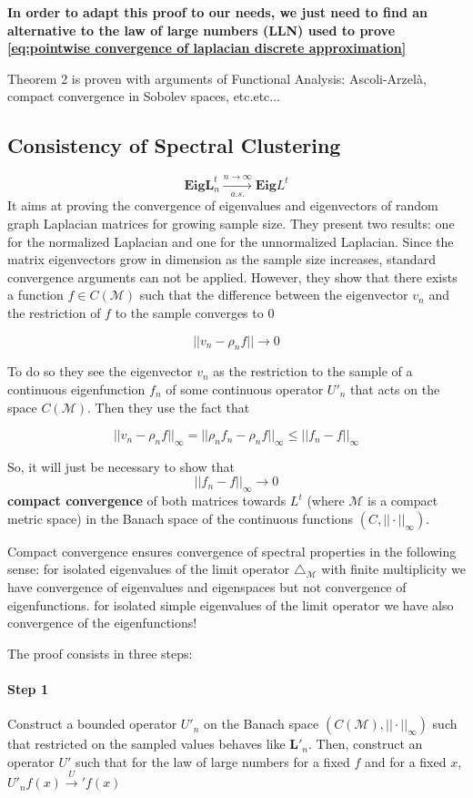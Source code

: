 \textbf{In order to adapt this proof to our needs, we just need to find an alternative to the law of large numbers (LLN) used to prove \ref{eq:pointwise convergence of laplacian discrete approximation}}

Theorem 2 is proven with arguments of Functional Analysis: Ascoli-Arzelà, compact convergence in Sobolev spaces, etc.etc...

\subsection{Consistency of Spectral Clustering}
 $$ \mathbf{Eig} \mathbf{L}^t_n \xrightarrow[a.s.]{n\to\infty} \mathbf{Eig} L^t $$
It aims at proving the convergence of eigenvalues and eigenvectors of random graph Laplacian matrices for growing sample size. They present two results: one for the normalized Laplacian and one for the unnormalized Laplacian. Since the matrix eigenvectors grow in dimension as the sample size increases, standard convergence arguments can not be applied. However, they show that there exists a function $f\in C(\mathcal M)$ such that the difference between the eigenvector $v_n$ and the restriction of $f$ to the sample converges to $0$

$$||v_n-\rho_nf||\rightarrow 0$$

To do so they see the eigenvector $v_n$ as the restriction to the sample of a continuous eigenfunction $f_n$ of some continuous operator $U'_n$ that acts on the space $C(\mathcal M)$. Then they use the fact that 

$$||v_n-\rho_nf||_\infty = ||\rho_nf_n-\rho_nf||_\infty\leq ||f_n-f||_\infty$$


So, it will just be necessary to show that  $$||f_n-f||_\infty\rightarrow 0$$
 \textbf{compact convergence} of both matrices towards $L^t$ (where $\mathcal M$ is a compact metric space) in the Banach space of the continuous functions $(C, ||\cdot||_\infty)$. 

Compact convergence ensures convergence of spectral properties in the following sense: for isolated eigenvalues of the limit operator $\triangle_\mathcal M$ with finite multiplicity we have convergence of eigenvalues and eigenspaces but not convergence of eigenfunctions. for isolated simple eigenvalues of the limit operator we have also convergence of the eigenfunctions!

The proof consists in three steps:
\paragraph{Step 1} Construct a bounded operator $U'_n$ on the Banach space $(C(\mathcal M), ||\cdot||_\infty)$ such that restricted on the sampled values behaves like $\mathbf{L}'_n$. Then, construct an operator $U'$ such that for the law of large numbers for a fixed $f$ and for a fixed $x$, $U'_nf(x) \xrightarrow U'f(x) $
